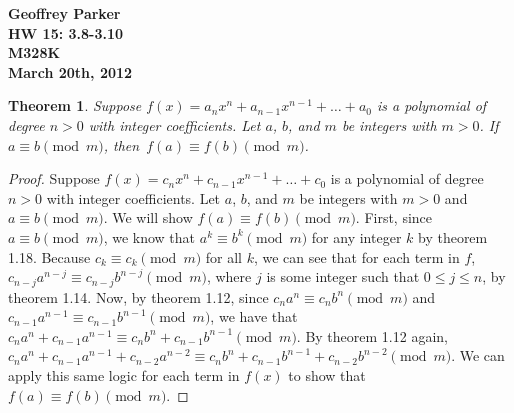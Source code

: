 \documentclass[12pt,leqno]{article}
\numberwithin{equation}{section}
\newtheorem{thm}{Theorem}[section]
\theoremstyle{definition}
\begin{document}
\thispagestyle{plain}
\begin{flushright}
\large{\textbf{Geoffrey Parker \\
HW 15: 3.8-3.10\\
M328K \\
March 20th, 2012 \\}}
\end{flushright}

\markboth{}{} \setcounter{section}{0} \baselineskip=18pt

\setcounter{tocdepth}{4}



\setcounter{section}{3}

\setcounter{thm}{7}


\begin{thm}
Suppose $f(x) = a_nx^n + a_{n-1}x^{n-1} + \hdots + a_0$ is a
polynomial of degree $n>0$ with integer coefficients.  Let $a$, $b$,
and $m$ be integers with $m > 0$.  If $a \equiv b \pmod{m}$,
then~$f(a) \equiv f(b) \pmod{m}$.
\end{thm}

\begin{proof}[Proof]
Suppose $f(x) = c_nx^n + c_{n-1}x^{n-1} + \hdots + c_0$ is a polynomial of degree $n>0$ with integer coefficients.  Let $a$, $b$, and $m$ be integers with $m > 0$ and $a \equiv b \pmod{m}$.  We will show $f(a) \equiv f(b) \pmod{m}$.  First, since $a \equiv b \pmod{m}$, we know that $a^k \equiv b^k \pmod{m}$ for any integer $k$ by theorem 1.18. Because $c_k \equiv c_k \pmod{m}$ for all $k$, we can see that for each term in $f$, $c_{n-j}a^{n-j} \equiv c_{n-j}b^{n-j} \pmod{m}$, where $j$ is some integer such that $0 \leq j \leq n$, by theorem 1.14.  Now, by theorem 1.12, since $c_na^n \equiv c_nb^n \pmod{m}$ and $c_{n-1}a^{n-1} \equiv c_{n-1}b^{n-1} \pmod{m}$, we have that $c_na^n + c_{n-1}a^{n-1} \equiv c_nb^n + c_{n-1}b^{n-1} \pmod{m}$.  By theorem 1.12 again, $c_na^n + c_{n-1}a^{n-1} + c_{n-2}a^{n-2} \equiv c_nb^n + c_{n-1}b^{n-1} + c_{n-2}b^{n-2} \pmod{m}$.  We can apply this same logic for each term in $f(x)$ to show that $f(a) \equiv f(b) \pmod{m}$.
\end{proof}
\end{document}
